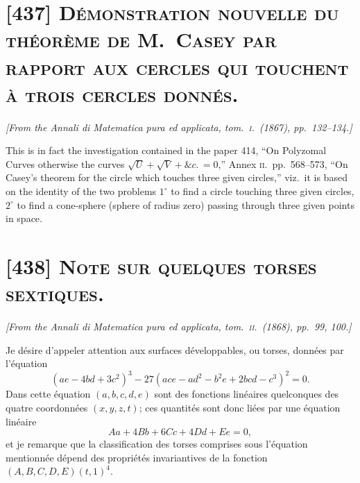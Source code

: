 \documentclass[11pt,a4paper]{article}
\begin{document}
\clearpage

\section{[437] \textsc{D\'emonstration nouvelle du th\'eor\`eme de M.\ Casey par rapport aux cercles qui touchent \`a trois cercles donn\'es.}}

\begin{center}
\textit{[From the Annali di Matematica pura ed applicata, tom.\ \textsc{i}.\ (1867), pp.\ 132--134.]}
\end{center}

\medskip

This is in fact the investigation contained in the paper 414, ``On Polyzomal Curves
otherwise the curves $\sqrt{U} + \sqrt{V} + \&c.\, = 0$,'' Annex \textsc{ii}.\ pp.\ 568--573,
``On Casey's theorem for the circle which touches three given circles,'' viz.\ it is
based on the identity of the two problems $1^\circ$ to find a circle touching three
given circles, $2^\circ$ to find a cone-sphere (sphere of radius zero) passing through
three given points in space.

\clearpage

\section{[438] \textsc{Note sur quelques torses sextiques.}}

\begin{center}
\textit{[From the Annali di Matematica pura ed applicata, tom.\ \textsc{ii}.\ (1868), pp.\ 99, 100.]}
\end{center}

\medskip

Je d\'esire d'appeler attention aux surfaces d\'eveloppables, ou torses, donn\'ees par
l'\'equation
\[
(ae - 4bd + 3c^2)^3 - 27 (ace - ad^2 - b^2 e + 2bcd - c^3)^2 = 0.
\]
Dans cette \'equation $(a, b, c, d, e)$ sont des fonctions lin\'eaires quelconques des
quatre coordonn\'ees $(x, y, z, t)$; ces quantit\'es sont donc li\'ees par une \'equation
lin\'eaire
\[
Aa + 4Bb + 6Cc + 4Dd + Ee = 0,
\]
et je remarque que la classification des torses comprises sous l'\'equation mentionn\'ee
d\'epend des propri\'et\'es invariantives de la fonction $(A, B, C, D, E)(t, 1)^4$.
\end{document}

